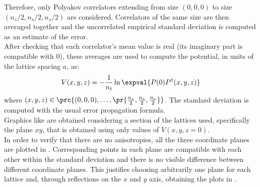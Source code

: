 Therefore, only Polyakov correlators extending from size $(0,0,0)$ to size $(n_s/2,n_s/2,n_s/2)$ are considered.
Correlators of the same size are then averaged together and the uncorrelated empirical standard deviation is computed as an estimate of the error.\\
After checking that each correlator's mean value is real (its imaginary part is compatible with $0$), these averages are used to compute the potential, in units of the lattice spacing $a$, as:
\begin{equation}
    V(x,y,z) = -\frac{1}{n_t}\ln\expval{P(0)P^\dagger(x,y,z)} \label{4:Potential}
\end{equation}
where $(x,y,z)\in\prc{(0,0,0),\dots,\pr{\frac{n_s}{2},\frac{n_s}{2},\frac{n_s}{2}}}$.
The standard deviation is computed with the usual error propagation formula.\\
Graphics like  are obtained considering a section of the lattices used, specifically the plane $xy$, that is obtained using only values of $V(x,y,z=0)$.\\
In order to verify that there are no anisotropies, all the three coordinate planes are plotted in .
Corresponding points in each plane are compatible with each other within the standard deviation and there is no visible difference between different coordinate planes.
This justifies choosing arbitrarily one plane for each lattice and, through reflections on the $x$ and $y$ axis, obtaining the plots in .
